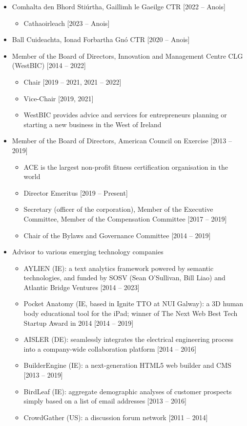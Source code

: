 \documentclass[10pt,a4paper]{res} %
\begin{document}
\begin{resume}
\begin{itemize} \itemsep -2pt
\item Comhalta den Bhord Sti\'{u}rtha, Gaillimh le Gaeilge CTR [2022 -- Anois]
\begin{itemize} \itemsep -2pt
\item Cathaoirleach [2023 -- Anois]
\end{itemize}
\item Ball Cuideachta, Ionad Forbartha Gn\'{o} CTR [2020 -- Anois]
\item Member of the Board of Directors, Innovation and Management Centre CLG (WestBIC) [2014 -- 2022]
\begin{itemize} \itemsep -2pt
\item Chair [2019 -- 2021, 2021 -- 2022]
\item Vice-Chair [2019, 2021]
\item WestBIC provides advice and services for entrepreneurs planning or starting a new business in the West of Ireland
\end{itemize}
\item Member of the Board of Directors, American Council on Exercise [2013 -- 2019]
\begin{itemize} \itemsep -2pt
\item ACE is the largest non-profit fitness certification organisation in the world
\item Director Emeritus [2019 -- Present]
\item Secretary (officer of the corporation), Member of the Executive Committee, Member of the Compensation Committee [2017 -- 2019]
\item Chair of the Bylaws and Governance Committee [2014 -- 2019]
\end{itemize}
\item Advisor to various emerging technology companies
\begin{itemize} \itemsep -2pt
\item AYLIEN (IE): a text analytics framework powered by semantic technologies, and funded by SOSV (Sean O'Sullivan, Bill Liao) and Atlantic Bridge Ventures [2014 -- 2023]
\item Pocket Anatomy (IE, based in Ignite TTO at NUI Galway): a 3D human body educational tool for the iPad; winner of The Next Web Best Tech Startup Award in 2014 [2014 -- 2019]
\item AISLER (DE): seamlessly integrates the electrical engineering process into a company-wide collaboration platform [2014 -- 2016]
\item BuilderEngine (IE): a next-generation HTML5 web builder and CMS [2013 -- 2019]
\item BirdLeaf (IE): aggregate demographic analyses of customer prospects simply based on a list of email addresses [2013 -- 2016]
\item CrowdGather (US): a discussion forum network [2011 -- 2014]
\end{itemize}
\end{itemize}


\end{resume}
\end{document}
